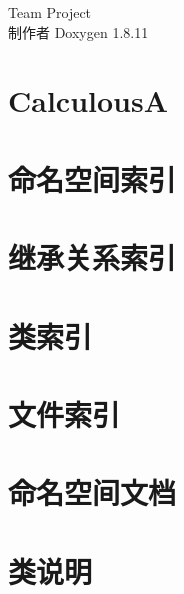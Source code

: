 \documentclass[twoside]{book}
\newcommand{\+}{\discretionary{\mbox{\scriptsize$\hookleftarrow$}}{}{}}
\newcommand{\clearemptydoublepage}{%
  \newpage{\pagestyle{empty}\cleardoublepage}%
}
\begin{document}
\hypersetup{pageanchor=false,
             bookmarksnumbered=true,
             pdfencoding=unicode
            }
\begin{titlepage}
\vspace*{7cm}
\begin{center}%
{\Large Team Project }\\
\vspace*{1cm}
{\large 制作者 Doxygen 1.8.11}\\
\end{center}
\end{titlepage}
\clearemptydoublepage
\tableofcontents
\clearemptydoublepage
{}
\hypersetup{pageanchor=true}

\chapter{CalculousA}
\label{md_README}
\hypertarget{md_README}{}

\chapter{命名空间索引}

\chapter{继承关系索引}

\chapter{类索引}

\chapter{文件索引}

\chapter{命名空间文档}

\chapter{类说明}






































\end{document}
